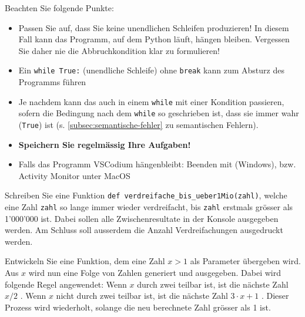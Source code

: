 \begin{myattention}
	Beachten Sie folgende Punkte:
	\begin{itemize}
		\item Passen Sie auf, dass Sie keine unendlichen Schleifen produzieren! In diesem Fall kann das Programm, auf dem Python läuft, hängen bleiben. Vergessen Sie daher nie die Abbruchkondition klar zu formulieren!
		\item Ein \lstinline|while True:| (unendliche Schleife) ohne \lstinline|break| kann zum Absturz des Programms führen 
		\item Je nachdem kann das auch in einem \lstinline|while| mit einer Kondition passieren, sofern die Bedingung nach dem \lstinline|while| so geschrieben ist, dass sie immer wahr (\lstinline|True|) ist (s. \cref{subsec:semantische-fehler} zu semantischen Fehlern).
		\item \textbf{Speichern Sie regelmässig Ihre Aufgaben!}
		\item Falls das Programm VSCodium hängenbleibt: Beenden mit  (Windows), bzw. Activity Monitor unter MacOS
	\end{itemize}
\end{myattention}

\begin{mysubmission}
	Schreiben Sie eine Funktion \lstinline|def verdreifache_bis_ueber1Mio(zahl)|, welche eine Zahl \texttt{zahl} so lange immer wieder verdreifacht, bis \texttt{zahl} erstmals grösser als 1'000'000 ist. Dabei sollen alle Zwischenresultate in der Konsole ausgegeben werden. Am Schluss soll ausserdem die Anzahl Verdreifachungen ausgedruckt werden.
	\begin{myanswer}
		
	\end{myanswer}
\end{mysubmission}

\begin{myexercise}
	Entwickeln Sie eine Funktion, dem eine Zahl $x > 1$ als Parameter übergeben wird. Aus $x$ wird nun eine Folge von Zahlen generiert und ausgegeben. Dabei wird folgende Regel angewendet: Wenn $x$ durch zwei teilbar ist, ist die nächste Zahl $x / 2$ . Wenn $x$ nicht durch zwei teilbar ist, ist die nächste Zahl $3 \cdot x + 1$ . Dieser Prozess wird wiederholt, solange die neu berechnete Zahl grösser als 1 ist.
	\begin{myanswer}
		
	\end{myanswer}
\end{myexercise}

